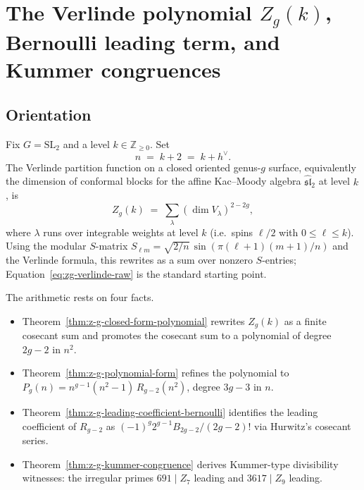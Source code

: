 %
%
%

\chapter{The Verlinde polynomial \texorpdfstring{$Z_g(k)$}{Z\_g(k)}, Bernoulli leading term, and Kummer congruences}
\label{ch:z-g-kummer-bernoulli}

\section*{Orientation}

Fix $G = \mathrm{SL}_2$ and a level $k \in \mathbb{Z}_{\ge 0}$. Set
\begin{equation}
n \;=\; k + 2 \;=\; k + h^{\vee}.
\end{equation}
The Verlinde partition function on a closed oriented genus-$g$ surface,
equivalently the dimension of conformal blocks for the affine Kac--Moody
algebra $\widehat{\mathfrak{sl}}_2$ at level $k$, is
\begin{equation}
\label{eq:zg-verlinde-raw}
Z_g(k) \;=\; \sum_{\lambda} \left( \dim V_\lambda \right)^{2-2g},
\end{equation}
where $\lambda$ runs over integrable weights at level $k$ (i.e.\ spins
$\ell/2$ with $0 \le \ell \le k$). Using the modular $S$-matrix
$S_{\ell m} = \sqrt{2/n}\,\sin(\pi (\ell+1)(m+1)/n)$ and the Verlinde formula,
this rewrites as a sum over nonzero $S$-entries; Equation~\eqref{eq:zg-verlinde-raw}
is the standard starting point.

The arithmetic rests on four facts.

\begin{itemize}
\item Theorem~\ref{thm:z-g-closed-form-polynomial} rewrites $Z_g(k)$ as a
finite cosecant sum and promotes the cosecant sum to a polynomial of degree
$2g - 2$ in $n^2$.
\item Theorem~\ref{thm:z-g-polynomial-form} refines the polynomial to
$P_g(n) = n^{g-1}(n^2-1)\,R_{g-2}(n^2)$, degree $3g - 3$ in $n$.
\item Theorem~\ref{thm:z-g-leading-coefficient-bernoulli} identifies the
leading coefficient of $R_{g-2}$ as
$(-1)^g2^{g-1}B_{2g-2}/(2g-2)!$ via Hurwitz's cosecant series.
\item Theorem~\ref{thm:z-g-kummer-congruence} derives Kummer-type
divisibility witnesses: the irregular primes $691 \mid Z_7$ leading and
$3617 \mid Z_9$ leading.
\end{itemize}


